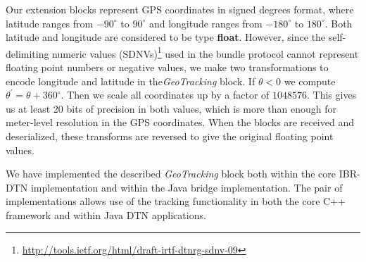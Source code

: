 Our extension blocks represent GPS coordinates in signed degrees format, where latitude ranges from $-90^{\circ}$ to $90^{\circ}$ and longitude ranges from $-180^{\circ}$ to $180^{\circ}$.  Both latitude and longitude are considered to be type {\bf float}.  However, since the self-delimiting numeric values (SDNVs)\footnote{\scriptsize\url{http://tools.ietf.org/html/draft-irtf-dtnrg-sdnv-09}} used in the bundle protocol cannot represent floating point numbers or negative values, we make two transformations to encode longitude and latitude in the{\em GeoTracking} block.  If $\theta<0$ we compute $\theta^{\prime}=\theta+360^{\circ}$.  Then we scale all coordinates up by a factor of $1048576$.  This gives us at least 20 bits of precision in both values, which is more than enough for meter-level resolution in the GPS coordinates.  When the blocks are received and deserialized, these transforms are reversed to give the original floating point values.

We have implemented the described {\em GeoTracking} block both within the core IBR-DTN implementation and within the Java bridge implementation. The pair of implementations allows use of the tracking functionality in both the core C++ framework and within Java DTN applications.



